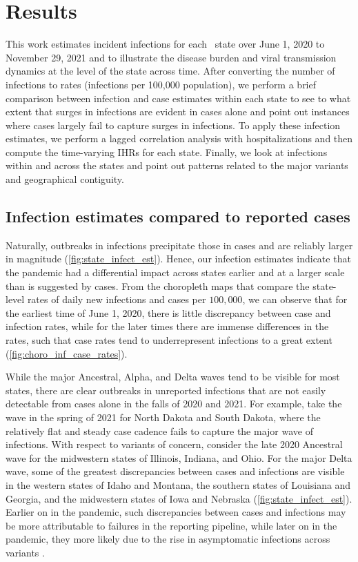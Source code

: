 \documentclass{article}
\begin{document}
\section{Results}

This work estimates incident infections for each \US\ state over June 1,
2020 to November 29, 2021 and to illustrate the disease burden and viral
transmission dynamics at the level of the state across time. After converting the number
of infections to rates (infections per 100,000 population), we perform a
brief comparison between infection and case estimates within each state to see
to what extent that surges in infections are evident in cases alone
and point out instances where cases largely fail to capture surges in infections.
To apply these infection estimates, we perform a lagged correlation analysis
with hospitalizations and then compute the time-varying IHRs for each state.
Finally, we look at infections within and across the states and point out patterns related to the major variants and geographical contiguity.

\subsection{Infection estimates compared to reported cases}

Naturally, outbreaks in infections precipitate those in cases and are reliably larger in
magnitude (\autoref{fig:state_infect_est}).
Hence, our infection estimates indicate
that the pandemic had a differential impact across states earlier and at a larger scale
than is suggested by cases. From the choropleth maps that compare the state-level rates 
of daily new infections and cases per $100,000$, we can observe
that for the earliest time of June 1, 2020, there is little discrepancy between case
and infection rates, while for the later times there are immense differences in the
rates, such that case rates tend to underrepresent infections to a great extent 
(\autoref{fig:choro_inf_case_rates}).

While the major Ancestral, Alpha, and Delta waves tend to be
visible for most states, there are clear outbreaks in unreported infections 
that are not easily detectable from cases alone in the 
falls of 2020 and 2021. For example, take the wave in the spring of 2021 for North Dakota and
South Dakota, where the relatively flat and steady case cadence fails to capture the major wave of infections.
With respect to variants of concern, consider the late 2020 Ancestral wave for the midwestern states of Illinois, Indiana, and
Ohio. For the major Delta wave, some of the greatest discrepancies between cases and infections are visible in the western states of Idaho and Montana, the southern states of Louisiana and Georgia, and the midwestern states of Iowa and Nebraska (\autoref{fig:state_infect_est}). Earlier on in the pandemic, such discrepancies between cases and infections may be more attributable to failures in the reporting pipeline, while later on in the pandemic, they more likely due to the rise in asymptomatic infections
across variants \citep{oph2022covid, garrett2022high}. 
\end{document}

